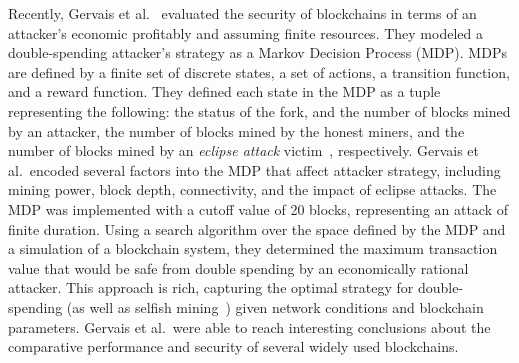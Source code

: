 
Recently, Gervais et al.~\cite{Gervais:2016} evaluated the security of blockchains in terms of an attacker's economic profitably and assuming finite resources. They modeled a double-spending attacker's strategy  as a Markov Decision Process (MDP). MDPs are defined by a finite set of discrete states, a set of actions, a transition function, and a reward function. They defined each  state in the MDP as a tuple representing the following: the status of the fork, and the number of blocks mined by an attacker,  the number of blocks mined by the honest miners, and  the number of blocks mined by an {\em eclipse attack} victim~\cite{Heilman:2015}, respectively.   Gervais et al.\ encoded several factors into the MDP that affect  attacker strategy, including mining power, block depth, connectivity, and the impact of eclipse attacks. The MDP was implemented with a cutoff value of 20 blocks, representing an attack of finite duration. Using a search algorithm over the space defined by the MDP and a simulation of a blockchain system, they determined the maximum transaction value that would be safe from double spending by an economically rational attacker. This  approach is rich, capturing the optimal strategy for  double-spending (as well as selfish mining~\cite{eyal:2014,sapirshtein:2015}) given  network conditions and blockchain parameters.  Gervais et al.\ were able to reach interesting conclusions about the comparative performance and security of several widely used blockchains.


